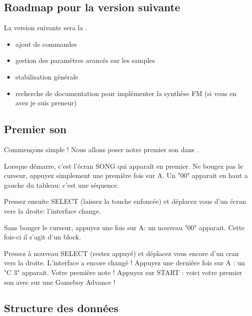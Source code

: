 \documentclass[12pt,a4paper]{article}
\begin{document}
    \subsection{Roadmap pour la version suivante}
    
    La version suivante sera la \fatnextversion. \medskip    
    \begin{itemize}
        \item{ajout de commandes}
        \item{gestion des paramètres avancés sur les samples}
        \item{stabilisation générale} 
        \item{recherche de documentation pour implémenter la synthèse FM (si vous en avez je suis preneur)}
    \end{itemize}
    
    \subsection{Premier son}

    Commençons simple ! Nous allons poser notre premier son dans \FAT.\medskip
    
    Lorsque \FAT démarre, c'est l'écran SONG qui apparaît en premier. Ne bougez pas le curseur, appuyez simplement une première fois sur A. Un "00" apparait en haut a gauche du tableau: c'est une séquence. 
    
    
    Pressez ensuite SELECT (laissez la touche enfoncée) et déplacez vous d'un écran vers la droite: l'interface change. 
    
    
    Sans bouger le curseur, appuyez une fois sur A: un nouveau "00" apparait. Cette fois-ci il s'agit d'un block. 
    
        
    Pressez à nouveau SELECT (restez appuyé) et déplacez vous encore d'un cran vers la droite. L'interface a encore changé ! Appuyez une dernière fois sur A : un "C 3" apparait. Votre première note ! Appuyez sur START : voici votre premier son avec \FAT sur une Gameboy Advance !
    
    
    \subsection{Structure des données}
    
\end{document}

